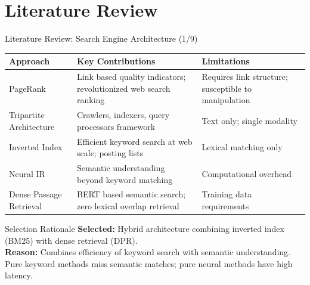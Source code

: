 \documentclass[aspectratio=169,xcolor=dvipsnames]{beamer}
\begin{document}
\section{Literature Review}

\begin{frame}{Literature Review: Search Engine Architecture (1/9)}
    \scriptsize
    \begin{table}
        \centering
        \renewcommand{\arraystretch}{1.1}
        \begin{tabular}{p{}|p{}|p{}}
        \toprule
        \textbf{Approach} & \textbf{Key Contributions} & \textbf{Limitations} \\
        \midrule
        PageRank \cite{page1999pagerank} & Link based quality indicators; revolutionized web search ranking & Requires link structure; susceptible to manipulation \\
        \midrule
        Tripartite Architecture \cite{brin1998anatomy} & Crawlers, indexers, query processors framework & Text only; single modality \\
        \midrule
        Inverted Index \cite{zobel2006inverted} & Efficient keyword search at web scale; posting lists & Lexical matching only \\
        \midrule
        Neural IR \cite{mitra2017neural} & Semantic understanding beyond keyword matching & Computational overhead \\
        \midrule
        Dense Passage Retrieval \cite{karpukhin2020dense} & BERT based semantic search; zero lexical overlap retrieval & Training data requirements \\
        \bottomrule
        \end{tabular}
    \end{table}
    
    \vspace{0.3em}
    \begin{block}{Selection Rationale}
        \textbf{Selected:} Hybrid architecture combining inverted index (BM25) with dense retrieval (DPR). \\
        \textbf{Reason:} Combines efficiency of keyword search with semantic understanding. Pure keyword methods miss semantic matches; pure neural methods have high latency.
    \end{block}
\end{frame}
\end{document}
